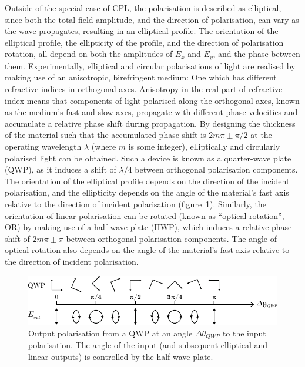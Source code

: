 Outside of the special case of CPL, the polarisation is described as elliptical, since both the total field amplitude, and the direction of polarisation, can vary as the wave propagates, resulting in an elliptical profile. The orientation of the elliptical profile, the ellipticity of the profile, and the direction of polarisation rotation, all depend on both the amplitudes of $E_x$ and $E_y$, and the phase between them.
Experimentally, elliptical and circular polarisations of light are realised by making use of an anisotropic, birefringent medium: One which has different refractive indices in orthogonal axes. Anisotropy in the real part of refractive index means that components of light polarised along the orthogonal axes, known as the medium's fast and slow axes, propagate with different phase velocities and accumulate a relative phase shift during propagation. By designing the thickness of the material such that the accumulated phase shift is $2m\pi \pm \pi/2$ at the operating wavelength $\lambda$ (where $m$ is some integer), elliptically and circularly polarised light can be obtained. Such a device is known as a quarter-wave plate (QWP), as it induces a shift of $\lambda/4$ between orthogonal polarisation components. The orientation of the elliptical profile depends on the direction of the incident polarisation, and the ellipticity depends on the angle of the material's fast axis relative to the direction of incident polarisation (figure~\ref{fig:background:Chirality:QWP}). Similarly, the orientation of linear polarisation can be rotated (known as ``optical rotation'', OR) by making use of a half-wave plate (HWP), which induces a relative phase shift of $2m\pi \pm \pi$ between orthogonal polarisation components. The angle of optical rotation also depends on the angle of the material's fast axis relative to the direction of incident polarisation.
\begin{figure}[htb!]
    \centering
    \includegraphics[scale=1.0]{./figures/background/chiroptics/QWP_in_out.pdf}
    \caption{\label{fig:background:Chirality:QWP}Output polarisation from a QWP at an angle $\Delta\theta_{QWP}$ to the input polarisation. The angle of the input (and subsequent elliptical and linear outputs) is controlled by the half-wave plate.}
\end{figure}

